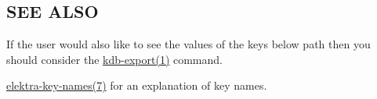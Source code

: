 \subsection*{S\+EE A\+L\+SO}


\begin{DoxyItemize}
\item If the user would also like to see the values of the keys below {\ttfamily path} then you should consider the \hyperlink{doc_help_kdb-export_md}{kdb-\/export(1)} command.
\item \hyperlink{doc_help_elektra-key-names_md}{elektra-\/key-\/names(7)} for an explanation of key names. 
\end{DoxyItemize}
